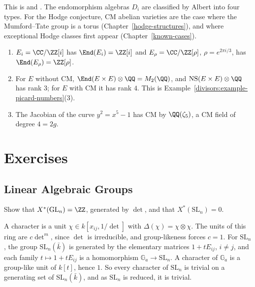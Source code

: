 This is \cite{birkenhake-lange} and \cite{mumford-abelian}. The endomorphism algebras $D_i$ are classified by
Albert into four types. For the Hodge conjecture, CM abelian varieties are the case where the Mumford--Tate group is a torus (Chapter~\ref{hodge-structures}), and where exceptional
Hodge classes first appear (Chapter~\ref{known-cases}).

\begin{example}\label{algebraic-groups:example-cm}
\begin{enumerate}
\item $E_i = \CC/\ZZ[i]$ has $\End(E_i) = \ZZ[i]$ and $E_\rho = \CC/\ZZ[\rho]$, $\rho = e^{2\pi i/3}$, has $\End(E_\rho) = \ZZ[\rho]$.
\item For $E$ without CM, $\End(E \times E) \otimes \QQ = M_2(\QQ)$, and $\mathrm{NS}(E \times E) \otimes \QQ$ has rank $3$; for $E$ with CM it has rank $4$. This is
Example~\ref{divisors:example-picard-numbers}(3).
\item The Jacobian of the curve $y^2 = x^5 - 1$ has CM by $\QQ(\zeta_5)$, a CM field of degree $4 = 2g$.
\end{enumerate}
\end{example}

\section{Exercises}\label{algebraic-groups:section-exercises}

\subsection{Linear Algebraic Groups}\label{algebraic-groups:subsection-exercises-linear-algebraic-groups}

\begin{exercise}\label{algebraic-groups:exercise-characters-gln}
Show that $X^*(\mathrm{GL}_n) = \ZZ$, generated by $\det$, and that $X^*(\mathrm{SL}_n) = 0$.
\end{exercise}

\begin{solution}
A character is a unit $\chi \in k[x_{ij}, 1/\det]$ with $\Delta(\chi) = \chi \otimes \chi$. The units of this ring are $c\det^m$, since $\det$ is irreducible, and group-likeness forces $c = 1$.
For $\mathrm{SL}_n$, the group $\mathrm{SL}_n(\bar k)$ is generated by the elementary matrices $1 + tE_{ij}$, $i \neq j$, and each family $t \mapsto 1 + tE_{ij}$ is a homomorphism
$\mathbb{G}_a \to \mathrm{SL}_n$. A character of $\mathbb{G}_a$ is a group-like unit of $k[t]$, hence $1$. So every character of $\mathrm{SL}_n$ is trivial on a generating set of
$\mathrm{SL}_n(\bar k)$, and as $\mathrm{SL}_n$ is reduced, it is trivial.
\end{solution}


